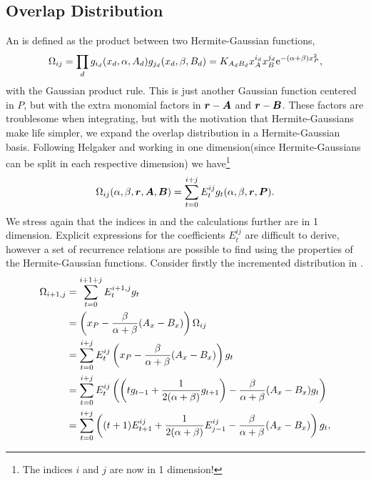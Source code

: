 \subsection{Overlap Distribution}
    An  is defined as the product between two
    Hermite-Gaussian functions,
        \begin{equation}
            \Omega_{ij} = \prod_d g_{i_d}(x_d,\alpha,A_d)g_{j_d}(x_d,\beta,B_d)
            =
            K_{A_dB_d}x_A^{i_d}x_B^{j_d}\mathrm{e}^{-(\alpha+\beta)x^2_P},
        \end{equation}
    with the Gaussian product rule. This is just another Gaussian function
    centered in $P$, but with the extra monomial factors in $\boldsymbol{{r}}-\boldsymbol{{A}}$
    and $\boldsymbol{{r}}-\boldsymbol{{B}}$. These factors are troublesome when integrating,
    but with the motivation that Hermite-Gaussians make life simpler, we expand
    the overlap distribution in a Hermite-Gaussian basis. Following Helgaker
    \cite{HelgakerTaylorGauss} and working in one dimension(since
    Hermite-Gaussians can be split in each respective dimension) we
    have\footnote{The indices $i$ and $j$ are now in 1 dimension!}
        \begin{equation}
            \Omega_{ij}(\alpha,\beta,\blds{r},\blds{A},\blds{B}) =
            \sum\limits^{i+j}_{t=0} E^{ij}_tg_t(\alpha,\beta,\blds{r},\blds{P}).
            \label{eq:omegaDef}
        \end{equation}
    We stress again that the indices in  and the calculations
    further are in 1 dimension. Explicit expressions for the coefficients
    $E^{ij}_t$ are difficult to derive, however a set of recurrence relations
    are possible to find using the properties of the Hermite-Gaussian
    functions. Consider firstly the incremented distribution in
    .
        \begin{align}
            \Omega_{i+1,j} &= \sum^{i+1+j}_{t=0} E^{i+1,j}_tg_t \nonumber \\
            &= \left(x_P -
            \frac{\beta}{\alpha+\beta}(A_x-B_x)\right)\Omega_{ij} \nonumber \\
            &= \suml{t=0}{i+j} E^{ij}_t\left(x_P -
            \frac{\beta}{\alpha+\beta}(A_x-B_x)\right) g_t \nonumber \\
            &= \suml{t=0}{i+j} E^{ij}_t\left(\left(tg_{t-1} +
            \frac{1}{2(\alpha+\beta)}g_{t+1}\right) -
            \frac{\beta}{\alpha+\beta}(A_x-B_x)g_t\right) \nonumber \\
            &= \suml{t=0}{i+j} \left((t+1)E^{ij}_{t+1} +
            \frac{1}{2(\alpha+\beta)}E^{ij}_{j-1} -
            \frac{\beta}{\alpha+\beta}(A_x-B_x)\right)g_t,
            \label{eq:omegaIncr}
        \end{align}

